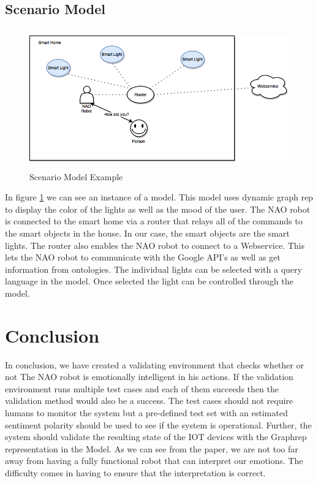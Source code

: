 \documentclass{lncs}
\begin{document}
\subsection{Scenario Model}

\begin{figure}%
\includegraphics[width=\linewidth, height=6cm]{home.png}
\caption{Scenario Model Example}
\label{fig:home}
\end{figure}

In figure \ref{fig:home} we can see an instance of a model. This model uses dynamic graph rep \cite{cs3657} to display the color of the lights as well as the mood of the user. The NAO robot is connected to the smart home via a router that relays all of the commands to the smart objects in the house. In our case, the smart objects are the smart lights. The router also enables the NAO robot to connect to a Webservice. This lets the NAO robot to communicate with the Google API's as well as get information from ontologies. The individual lights can be selected with a query language in the model. Once selected the light can be controlled through the model.

\section{Conclusion}

In conclusion, we have created a validating environment that checks whether or not The NAO robot is emotionally intelligent in his actions. If the validation environment runs multiple test cases and each of them succeeds then the validation method would also be a success. The test cases should not require humans to monitor the system but a pre-defined test set with an estimated sentiment polarity should be used to see if the system is operational. Further, the system should validate the resulting state of the IOT devices with the Graphrep representation in the Model. As we can see from the paper, we are not too far away from having a fully functional robot that can interpret our emotions. The difficulty comes in having to ensure that the interpretation is correct.
\end{document}
